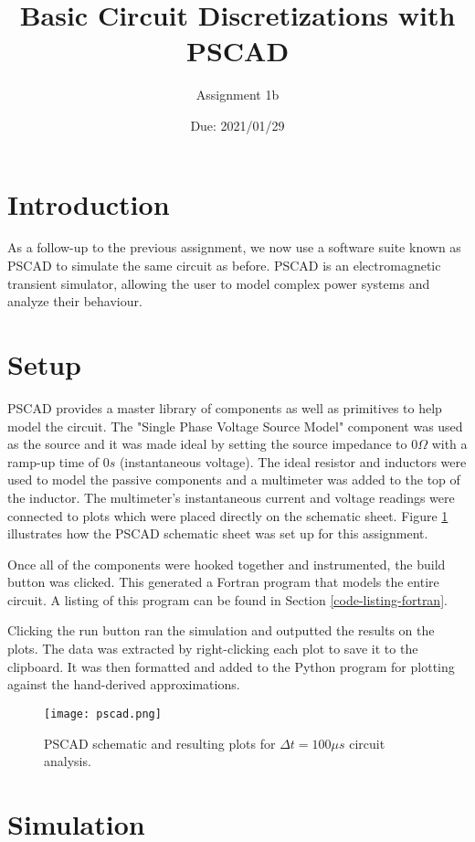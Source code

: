 \documentclass[10pt, oneside, letterpaper]{article}
\title{Basic Circuit Discretizations with PSCAD}
\author{Assignment 1b}
\date{Due: 2021/01/29}
\begin{document}
\maketitle
\thispagestyle{fancy}

\section{Introduction}
As a follow-up to the previous assignment, we now use a software suite known as PSCAD to simulate the same circuit as before. PSCAD is an electromagnetic transient simulator, allowing the user to model complex power systems and analyze their behaviour.

\section{Setup}
PSCAD provides a master library of components as well as primitives to help model the circuit. The "Single Phase Voltage Source Model" component was used as the source and it was made ideal by setting the source impedance to $0 \Omega{}$ with a ramp-up time of $0 s$ (instantaneous voltage). The ideal resistor and inductors were used to model the passive components and a multimeter was added to the top of the inductor. The multimeter's instantaneous current and voltage readings were connected to plots which were placed directly on the schematic sheet. Figure \ref{pscad-setup} illustrates how the PSCAD schematic sheet was set up for this assignment.

Once all of the components were hooked together and instrumented, the build button was clicked. This generated a Fortran program that models the entire circuit. A listing of this program can be found in Section \ref{code-listing-fortran}.

Clicking the run button ran the simulation and outputted the results on the plots. The data was extracted by right-clicking each plot to save it to the clipboard. It was then formatted and added to the Python program for plotting against the hand-derived approximations.

\begin{figure}[H]
\centering
\texttt{[image: pscad.png]}
\caption{PSCAD schematic and resulting plots for $\Delta{}t = 100\mu{}s$ circuit analysis.}
\label{pscad-setup}
\end{figure}

\section{Simulation}
\end{document}
